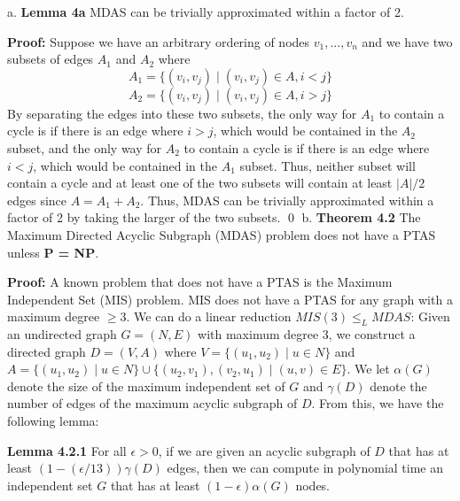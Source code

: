 \documentclass[oneside]{projectpaper} %
\begin{document}
{\large a.} \textbf{Lemma 4a} MDAS can be trivially approximated within a factor of 2.
\newline

\textbf{Proof:} Suppose we have an arbitrary ordering of nodes $v_1, ..., v_n$ and we have two subsets of edges $A_1$ and $A_2$ where $$A_1 = \{(v_i, v_j) \mid (v_i, v_j) \in A, i < j\}$$ $$A_2 = \{(v_i, v_j) \mid (v_i, v_j) \in A, i > j\}$$ By separating the edges into these two subsets, the only way for $A_1$ to contain a cycle is if there is an edge where $i > j$, which would be contained in the $A_2$ subset, and the only way for $A_2$ to contain a cycle is if there is an edge where $ i < j$, which would be contained in the $A_1$ subset. Thus, neither subset will contain a cycle and at least one of the two subsets will contain at least $|A|/2$ edges since $A = A_1 + A_2$. Thus, MDAS can be trivially approximated within a factor of 2 by taking the larger of the two subsets. \hfill\qed
\newline
\newline
{\large b.} \textbf{Theorem 4.2} The Maximum Directed Acyclic Subgraph (MDAS) problem does not have a PTAS unless \textbf{P = NP}.
\newline

\textbf{Proof:} A known problem that does not have a PTAS is the Maximum Independent Set (MIS) problem. MIS does not have a PTAS for any graph with a maximum degree $\geq 3$. We can do a linear reduction $MIS(3) \leq_L MDAS$: Given an undirected graph $G = (N, E)$ with maximum degree 3, we construct a directed graph $D = (V, A)$ where $V = \{(u_1, u_2) \mid u \in N\}$ and $A = \{(u_1, u_2) \mid u \in N\}  \cup \{(u_2, v_1),(v_2, u_1) \mid (u, v) \in E\}$. We let $\alpha(G)$ denote the size of the maximum independent set of $G$ and $\gamma(D)$ denote the number of edges of the maximum acyclic subgraph of $D$. From this, we have the following lemma:
\newline

\textbf{Lemma 4.2.1} For all $\epsilon > 0$, if we are given an acyclic subgraph of $D$ that has at least $(1-(\epsilon/13))\gamma(D)$ edges, then we can compute in polynomial time an independent set $G$ that has at least $(1-\epsilon)\alpha(G)$ nodes.
\newline
\end{document}
